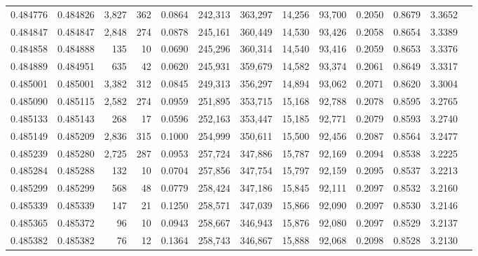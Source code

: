 \begin{tabular}{rrrrrrrrrrrrr}
0.484776 & 0.484826 & 3,827 &   362 &                                     0.0864 & 242,313 & 363,297 &  14,256 &  93,700 & 0.2050 & 0.8679 & 3.3652 \\
0.484847 & 0.484847 & 2,848 &   274 &                                     0.0878 & 245,161 & 360,449 &  14,530 &  93,426 & 0.2058 & 0.8654 & 3.3389 \\
0.484858 & 0.484888 &   135 &    10 &                                     0.0690 & 245,296 & 360,314 &  14,540 &  93,416 & 0.2059 & 0.8653 & 3.3376 \\
0.484889 & 0.484951 &   635 &    42 &                                     0.0620 & 245,931 & 359,679 &  14,582 &  93,374 & 0.2061 & 0.8649 & 3.3317 \\
0.485001 & 0.485001 & 3,382 &   312 &                                     0.0845 & 249,313 & 356,297 &  14,894 &  93,062 & 0.2071 & 0.8620 & 3.3004 \\
0.485090 & 0.485115 & 2,582 &   274 &                                     0.0959 & 251,895 & 353,715 &  15,168 &  92,788 & 0.2078 & 0.8595 & 3.2765 \\
0.485133 & 0.485143 &   268 &    17 &                                     0.0596 & 252,163 & 353,447 &  15,185 &  92,771 & 0.2079 & 0.8593 & 3.2740 \\
0.485149 & 0.485209 & 2,836 &   315 &                                     0.1000 & 254,999 & 350,611 &  15,500 &  92,456 & 0.2087 & 0.8564 & 3.2477 \\
0.485239 & 0.485280 & 2,725 &   287 &                                     0.0953 & 257,724 & 347,886 &  15,787 &  92,169 & 0.2094 & 0.8538 & 3.2225 \\
0.485284 & 0.485288 &   132 &    10 &                                     0.0704 & 257,856 & 347,754 &  15,797 &  92,159 & 0.2095 & 0.8537 & 3.2213 \\
0.485299 & 0.485299 &   568 &    48 &                                     0.0779 & 258,424 & 347,186 &  15,845 &  92,111 & 0.2097 & 0.8532 & 3.2160 \\
0.485339 & 0.485339 &   147 &    21 &                                     0.1250 & 258,571 & 347,039 &  15,866 &  92,090 & 0.2097 & 0.8530 & 3.2146 \\
0.485365 & 0.485372 &    96 &    10 &                                     0.0943 & 258,667 & 346,943 &  15,876 &  92,080 & 0.2097 & 0.8529 & 3.2137 \\
0.485382 & 0.485382 &    76 &    12 &                                     0.1364 & 258,743 & 346,867 &  15,888 &  92,068 & 0.2098 & 0.8528 & 3.2130 \\

\end{tabular}
